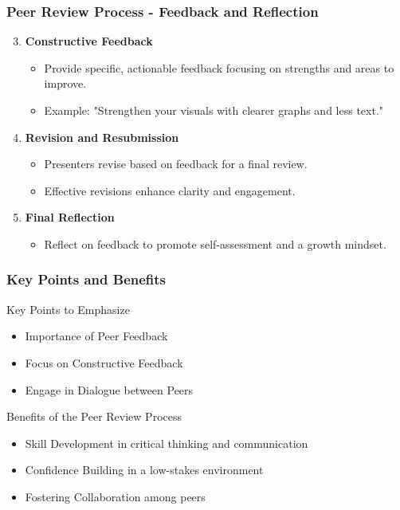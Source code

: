 \documentclass{beamer}
\begin{document}
\begin{frame}[fragile]
    \frametitle{Peer Review Process - Feedback and Reflection}
    \begin{enumerate}
        \setcounter{enumi}{2} %
        \item \textbf{Constructive Feedback}
        \begin{itemize}
            \item Provide specific, actionable feedback focusing on strengths and areas to improve.
            \item Example: "Strengthen your visuals with clearer graphs and less text."
        \end{itemize}

        \item \textbf{Revision and Resubmission}
        \begin{itemize}
            \item Presenters revise based on feedback for a final review.
            \item Effective revisions enhance clarity and engagement.
        \end{itemize}
        
        \item \textbf{Final Reflection}
        \begin{itemize}
            \item Reflect on feedback to promote self-assessment and a growth mindset.
        \end{itemize}
    \end{enumerate}
\end{frame}

\begin{frame}[fragile]
    \frametitle{Key Points and Benefits}
    \begin{block}{Key Points to Emphasize}
        \begin{itemize}
            \item Importance of Peer Feedback
            \item Focus on Constructive Feedback
            \item Engage in Dialogue between Peers
        \end{itemize}
    \end{block}

    \begin{block}{Benefits of the Peer Review Process}
        \begin{itemize}
            \item Skill Development in critical thinking and communication
            \item Confidence Building in a low-stakes environment
            \item Fostering Collaboration among peers
        \end{itemize}
    \end{block}
\end{frame}
\end{document}
